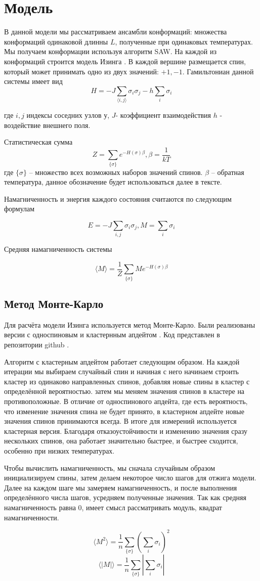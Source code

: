 \section{Модель}

В данной модели мы рассматриваем ансамбли конформаций: множества конформаций одинаковой длинны $L$, полученные при одинаковых температурах. Мы получаем конформации используя алгоритм SAW.
На каждой из конформаций строится модель Изинга \cite{ising}. В каждой вершине размещается спин, который может принимать одно из двух значений: $+1, -1$.
Гамильтониан данной системы имеет вид
\[H = -J\sum_{\langle i, j\rangle}{\sigma_i\sigma_j} - h\sum_i{\sigma_i} \]

где $i, j$ индексы соседних узлов у, $J$- коэффициент взаимодействия $h$ - воздействие внешнего поля.

Статистическая сумма
\[Z = \sum_{\{\sigma\}} e^{-H(\sigma)\beta}, \beta = \frac{1}{kT}\]
где $\{\sigma\}$ -- множество всех возможных наборов значений спинов. $\beta$ -- обратная температура, данное обозначение будет использоваться далее в тексте.

Намагниченность и энергия каждого состояния считаются по следующим формулам

\[ 
E = -J\sum_{i, j} \sigma_i \sigma_j, 
M = \sum_i \sigma_i
\]

Средняя намагниченность системы

\[
\langle M \rangle = \frac{1}{Z}  \sum_{\{\sigma\}} M e^{-H(\sigma)\beta}
\]

\subsection{Метод Монте-Карло}
Для расчёта модели Изинга используется метод Монте-Карло. Были реализованы версии с односпиновым и кластернным апдейтом \cite{wolf_algorithm}. Код представлен в репозитории github \cite{github}. 

Алгоритм с кластерным апдейтом работает следующим образом. На каждой итерации мы выбираем случайный спин и начиная с него начинаем строить кластер из одинаково направленных спинов, добавляя новые спины в кластер с определённой вероятностью. затем мы меняем значения спинов в кластере на противоположные. В отличие от односпинового апдейта, где есть вероятность, что изменение значения спина не будет принято, в кластерном апдейте новые значения спинов принимаются всегда.
В итоге для измерений используется кластерная версия. Благодаря отказоустойчивости и изменению значения сразу нескольких спинов, она работает значительно быстрее, и быстрее сходится, особенно при низких температурах.

Чтобы вычислить намагниченность, мы сначала случайным образом инициализируем спины, затем делаем некоторое число шагов для отжига модели. Далее на каждом шаге мы замеряем намагниченность, и после выполнения определённого числа шагов, усредняем полученные значения. Так как средняя намагниченность равна 0, имеет смысл рассматривать модуль, квадрат намагниченности.

\[
\langle M^2\rangle = \frac{1}{n} \sum_{\{\sigma\}} \left( \sum_i \sigma_i \right)^2
\]
\[
\langle |M|\rangle = \frac{1}{n} \sum_{\{\sigma\}} \left| \sum_i \sigma_i \right|
\]